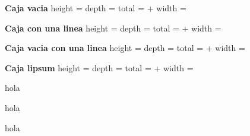 \documentclass[sin nombre]{plantilla-evaluacion-v1}
\begin{document}
  
{\bfseries Caja vacia} \newline
height = \the\ht\cajarespuesta\newline
depth = \the\dp\cajarespuesta\newline
total = \the\dimexpr \ht\cajarespuesta+\dp\cajarespuesta\relax\newline
width = \the\wd\cajarespuesta \newline
\usebox{\cajarespuesta}

{\bfseries Caja con una linea} \newline
height = \the\ht\cajarespuestauno\newline
depth = \the\dp\cajarespuestauno\newline
total = \the\dimexpr \ht\cajarespuestauno+\dp\cajarespuestauno\relax\newline
width = \the\wd\cajarespuestauno \newline
\usebox{\cajarespuestauno}

{\bfseries Caja vacia con una linea} \newline
height = \the\ht\cajarespuestaunalinea\newline
depth = \the\dp\cajarespuestaunalinea\newline
total = \the\dimexpr \ht\cajarespuestaunalinea+\dp\cajarespuestaunalinea\relax\newline
width = \the\wd\cajarespuestaunalinea \newline
\usebox{\cajarespuestaunalinea}

{\bfseries Caja lipsum} \newline
height = \the\ht\cajarespuestalipsum\newline
depth = \the\dp\cajarespuestalipsum\newline
total = \the\dimexpr \ht\cajarespuestalipsum+\dp\cajarespuestalipsum\relax\newline
width = \the\wd\cajarespuestalipsum \newline
\usebox{\cajarespuestalipsum}


\begin{respuesta*}
  hola
\end{respuesta*}

\begin{respuesta*}[2]
  hola
\end{respuesta*}

\begin{respuesta*}[3]
  hola
\end{respuesta*}
\end{document}

